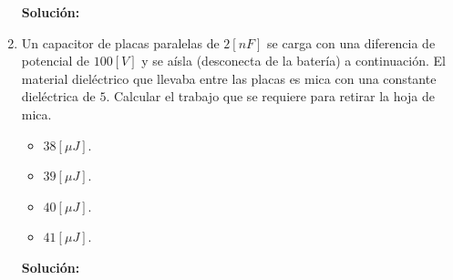 \documentclass[letter,11pt]{article}
\begin{document}
\begin{enumerate}
\textbf{Solución:} \\

\item Un capacitor de placas paralelas de $2 [nF]$ se carga con una diferencia
de potencial de $100 [V]$ y se aísla (desconecta de la batería) a continuación.
El material dieléctrico que llevaba entre las placas es mica con una constante
dieléctrica de $5$. Calcular el trabajo que se requiere para retirar la hoja de
mica.

\begin{itemize}
    \item $38 [\mu J]$.
    \item $39 [\mu J]$.
    \item $40 [\mu J]$.
    \item $41 [\mu J]$.
\end{itemize}

\textbf{Solución:} \\

\end{enumerate}
\end{document}
